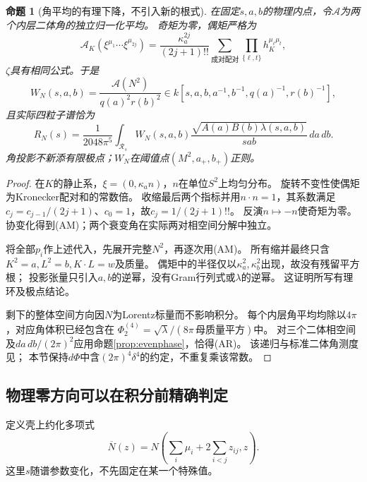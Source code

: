 \documentclass[11pt,a4paper]{ctexart}
\theoremstyle{cnplain}\newtheorem{theorem}{定理}[section]
\newtheorem{proposition}[theorem]{命题}
\theoremstyle{definition}\newtheorem{definition}[theorem]{定义}
\theoremstyle{remark}\newtheorem{remark}[theorem]{注}
\begin{document}
\begin{proposition}[角平均的有理下降，不引入新的根式]\label{prop:angularmoments}
在固定$s,a,b$的物理内点，令$\mathcal A$为两个内层二体角的独立归一化平均。
奇矩为零，偶矩严格为
\[
 \mathcal A_K(\xi^{\mu_1}\cdots\xi^{\mu_{2j}})
 =\frac{\kappa_a^{2j}}{(2j+1)!!}
   \sum_{\text{成对配对}}\prod_{\{\ell,t\}}h_K^{\mu_\ell\mu_t},
 \tag{AM}\label{eq:angularmoments}
\]
$\zeta$具有相同公式。于是
\[
 W_N(s,a,b)=\frac{\mathcal A(N^2)}{q(a)^2r(b)^2}
 \in k[s,a,b,a^{-1},b^{-1},q(a)^{-1},r(b)^{-1}],
\]
且实际四粒子谱恰为
\[
 R_N(s)=\frac1{2048\pi^5}\int_{\mathcal R_s}
       W_N(s,a,b)\frac{\sqrt{A(a)B(b)\lambda(s,a,b)}}{sab}\,da\,db.
 \tag{AR}\label{eq:angularreduced}
\]
角投影不新添有限极点；$W_N$在阈值点$(M^2,a_+,b_+)$正则。
\end{proposition}
\begin{proof}
在$K$的静止系，$\xi=(0,\kappa_a n)$，$n$在单位$S^2$上均匀分布。
旋转不变性使偶矩为Kronecker配对和的常数倍。
收缩最后两个指标并用$n\cdot n=1$，其系数满足
$c_j=c_{j-1}/(2j+1)$、$c_0=1$，故$c_j=1/(2j+1)!!$。
反演$n\mapsto-n$使奇矩为零。
协变化得到(AM)；两个衰变角在实际两对相空间分解中独立。

将全部$p_i$作上述代入，先展开完整$N^2$，再逐次用(AM)。
所有缩并最终只含$K^2=a,L^2=b,K\cdot L=w$及质量。
偶矩中的半径仅以$\kappa_a^2,\kappa_b^2$出现，故没有残留平方根；
投影张量只引入$a,b$的逆幂，没有Gram行列式或$\lambda$的逆幂。
这证明所写有理环及极点结论。

剩下的整体空间方向因$N$为Lorentz标量而不影响积分。
每个内层角平均均除以$4\pi$，对应角体积已经包含在
$\Phi_2^{(4)}=\sqrt{\lambda}/(8\pi\,\text{母质量平方})$中。
对三个二体相空间及$da\,db/(2\pi)^2$应用命题\ref{prop:evenphase}，恰得(AR)。
该递归与标准二体角测度见\cite[式(49.9)、(49.12)--(49.18)]{PDGphase}；
本节保持$d\Phi$中含$(2\pi)^4\delta^4$的约定，不重复乘该常数。
\end{proof}

\subsection{物理零方向可以在积分前精确判定}
定义壳上约化多项式
\[
 \overline N(z)=N\left(\sum_i\mu_i+2\sum_{i<j}z_{ij},z\right).
 \tag{AN}\label{eq:angularnormalform}
\]
这里$s$随谱参数变化，不先固定在某一个特殊值。
\end{document}
